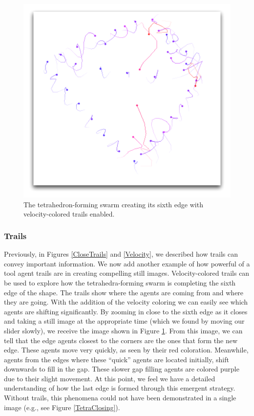\documentclass[conference]{IEEEtran}
\begin{document}
\begin{figure}
\centering
\includegraphics[scale=.5]{images/tetrastrategy.pdf}
\caption{
The tetrahedron-forming swarm creating its sixth edge with velocity-colored trails enabled.
}
\label{TetraStrategy}
\end{figure}

\subsubsection{Trails}

Previously, in Figures \ref{CloseTrails} and \ref{Velocity}, we described how trails can convey important information.
We now add another example of how powerful of a tool agent trails are in creating compelling still images.
Velocity-colored trails can be used to explore how the tetrahedra-forming swarm is completing the sixth edge of the shape.
The trails show where the agents are coming from and where they are going.
With the addition of the velocity coloring we can easily see which agents are shifting significantly.
By zooming in close to the sixth edge as it closes and taking a still image at the appropriate time (which we found
by moving our slider slowly), we receive the image shown in Figure \ref{TetraStrategy}.
From this image, we can tell that the edge agents closest to the corners are the ones that form the new edge.
These agents move very quickly, as seen by their red coloration.
Meanwhile, agents from the edges where these ``quick'' agents are located initially, shift downwards to fill in the gap. These slower gap filling agents are colored purple due to their slight movement.
At this point, we feel we have a detailed understanding of how the last edge is formed through this emergent strategy.
Without trails, this phenomena could not have been demonstrated in a single image (e.g., see Figure \ref{TetraClosing}).
\end{document}
